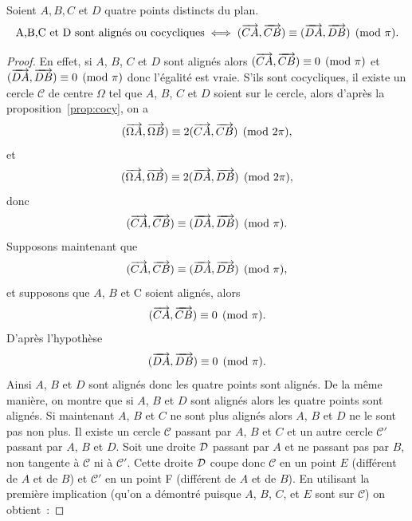 \begin{theo}
  Soient $A,B,C$ et $D$ quatre points distincts du plan.
  \begin{equation}
    \text{A,B,C et D sont alignés ou cocycliques} \iff (\overrightarrow{CA}, \overrightarrow{CB}) \equiv (\overrightarrow{DA}, \overrightarrow{DB}) \pmod {\pi}.
  \end{equation}
\end{theo}
\begin{proof}
  En effet, si $A$, $B$, $C$ et $D$ sont alignés alors $(\overrightarrow{CA},\overrightarrow{CB}) \equiv 0 \pmod {\pi}$ et $(\overrightarrow{DA},\overrightarrow{DB}) \equiv 0 \pmod {\pi}$ donc l'égalité est vraie. S'ils sont cocycliques, il existe un cercle $\mathcal{C}$ de centre $\Omega$ tel que $A$, $B$, $C$ et $D$ soient sur le cercle, alors d'après la proposition~\ref{prop:cocy}, on a
  \begin{equation}
    (\overrightarrow{\Omega A}, \overrightarrow{\Omega B}) \equiv 2(\overrightarrow{CA},\overrightarrow{CB}) \pmod {2\pi},
  \end{equation}
  et 
  \begin{equation}
    (\overrightarrow{\Omega A}, \overrightarrow{\Omega B}) \equiv 2(\overrightarrow{DA},\overrightarrow{DB}) \pmod {2\pi},
  \end{equation}
  donc 
  \begin{equation}
    (\overrightarrow{CA},\overrightarrow{CB}) \equiv (\overrightarrow{DA},\overrightarrow{DB}) \pmod {\pi}.
  \end{equation}
  Supposons maintenant que 
  \begin{equation}
    (\overrightarrow{CA},\overrightarrow{CB}) \equiv (\overrightarrow{DA},\overrightarrow{DB}) \pmod {\pi},
  \end{equation}
  et supposons que $A$, $B$ et C soient alignés, alors 
  \begin{equation}
    (\overrightarrow{CA},\overrightarrow{CB}) \equiv 0 \pmod {\pi}.
  \end{equation}
  D'après l'hypothèse
  \begin{equation}
    (\overrightarrow{DA},\overrightarrow{DB}) \equiv 0 \pmod {\pi}.
  \end{equation}
  Ainsi $A$, $B$ et $D$ sont alignés donc les quatre points sont alignés. De la même manière, on montre que si $A$, $B$ et $D$ sont alignés alors les quatre points sont alignés. Si maintenant $A$, $B$ et $C$ ne sont plus alignés alors $A$, $B$ et $D$ ne le sont pas non plus. Il existe un cercle $\mathcal{C}$ passant par $A$, $B$ et $C$ et un autre cercle $\mathcal{C}'$ passant par $A$, $B$ et $D$. Soit une droite $\mathcal{D}$ passant par $A$ et ne passant pas par $B$, non tangente à $\mathcal{C}$ ni à $\mathcal{C}'$. Cette droite $\mathcal{D}$ coupe donc $\mathcal{C}$ en un point $E$ (différent de $A$ et de $B$) et $\mathcal{C}'$ en un point F (différent de $A$ et de $B$). En utilisant la première implication (qu'on a démontré puisque $A$, $B$, $C$, et $E$ sont sur $\mathcal{C}$) on obtient~:

\end{proof}
